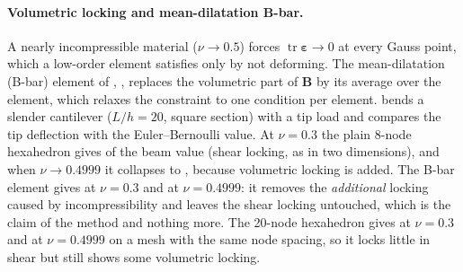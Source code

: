 \paragraph{Volumetric locking and mean-dilatation B-bar.}
A nearly incompressible material ($\nu\to0.5$) forces $\operatorname{tr}\bm\varepsilon\to0$ at every Gauss point, which a low-order element satisfies only by not deforming. The mean-dilatation (B-bar) element of \citet{hughes1980bbar}, , replaces the volumetric part of $\bm B$ by its average over the element, which relaxes the constraint to one condition per element.  bends a slender cantilever ($L/h=20$, square section) with a tip load and compares the tip deflection with the Euler--Bernoulli value. At $\nu=0.3$ the plain 8-node hexahedron gives \cecLockHexPlainA{} of the beam value (shear locking, as in two dimensions), and when $\nu\to0.4999$ it collapses to \cecLockHexPlainB{}, because volumetric locking is added. The B-bar element gives \cecLockHexBbarA{} at $\nu=0.3$ and \cecLockHexBbarB{} at $\nu=0.4999$: it removes the \emph{additional} locking caused by incompressibility and leaves the shear locking untouched, which is the claim of the method and nothing more. The 20-node hexahedron gives \cecLockHexTwentyA{} at $\nu=0.3$ and \cecLockHexTwentyB{} at $\nu=0.4999$ on a mesh with the same node spacing, so it locks little in shear but still shows some volumetric locking.

\begin{table}[ht]
\centering\small

\caption{Tip deflection of a slender cantilever divided by the Euler--Bernoulli value, three hexahedra and two Poisson ratios. The 20-node mesh has the node spacing of the 8-node mesh. A 3-D beam does not reach exactly 1 even for a perfect element (root and shear effects), so only the differences between the rows are significant.}\label{tab:el-locking}
\end{table}

